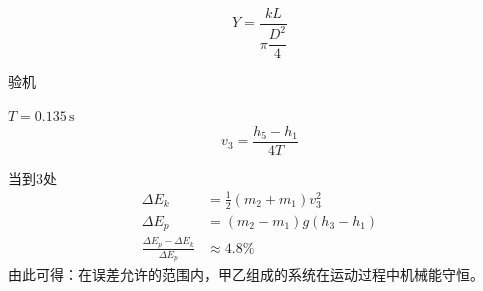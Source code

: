 \[ Y=\frac{kL}{\pi\dfrac{D^2}{4}} \]
\begin{problem}
验机 %



$T=0.135\,\mathrm{s}$ %
\[ v_3=\frac{h_5-h_1}{4T} \]

\begin{solution}
当到3处
\begin{align*}
\Delta E_k&=\frac12(m_2+m_1)v_3^2\\
\Delta E_p&=(m_2-m_1)g(h_3-h_1)\\
\frac{\Delta E_p-\Delta E_k}{\Delta E_p}&\approx 4.8\%
\end{align*}
由此可得：在误差允许的范围内，甲乙组成的系统在运动过程中机械能守恒。
\end{solution}
\end{problem}
